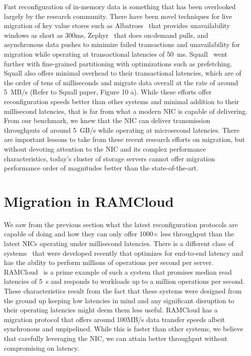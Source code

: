 Fast reconfiguration of in-memory data is something that has been overlooked largely
by the research community. There have been novel techniques for live migration of 
key value stores such as Albatross~\cite{albatross} that provides unavailability windows 
as short as 300ms, Zephyr~\cite{zephyr} that does on-demand pulls, and asynchronous data 
pushes to minimize failed transactions and unavailability for migration while operating 
at transactional latencies of 50~ms. Squall~\cite{squall} went further with fine-grained 
partitioning with optimizations such as prefetching. Squall also offers minimal overhead 
to their transactional latencies, which are of the order of tens of milliseconds and migrate 
data overall at the rate of around 5~MB/s (Refer to Squall paper, Figure 10 a). While these efforts offer reconfiguration speeds 
better than other systems and minimal addition to their millisecond latencies, that is far 
from what a modern NIC is capable of delivering. From our benchmark, we knew that the NIC 
can deliver transmission throughputs of around 5~GB/s while operating at microsecond latencies. 
There are important lessons to take from these recent research efforts on migration, but without 
devoting attention to the NIC and its complex performance characteristics, today's cluster of
storage servers cannot offer migration performance order of magnitudes better than the state-of-the-art.

\section{Migration in RAMCloud}
We saw from the previous section what the latest reconfiguration protocols are capable of doing and how they can only 
offer 1000$\times$ less throughput than the latest NICs operating under millisecond latencies. There is a different class of systems~\cite{ramcloud,farm,rdmabillion,herd} that 
were developed recently that optimizes for end-to-end latency and has the ability to perform millions of operations 
per second per server. RAMCloud~\cite{ramcloud} is a prime example of such a system that promises median read latencies 
of 5\textmu~s and responds to workloads up to a million operations per second. These characteristics result from the fact that 
these systems were designed from the ground up keeping low latencies in mind and any significant disruption to their operating 
latencies might deem them less useful. RAMCloud has a migration protocol that offers around 100MB/s data transfer speeds albeit 
synchronous and unpipelined. While this is faster than other systems, we believe that carefully leveraging the NIC, 
we can attain better throughput without compromising on latency.

